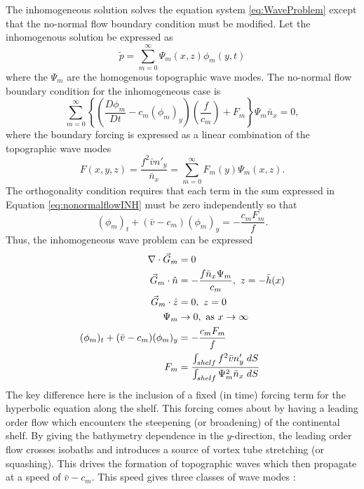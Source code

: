 \documentclass[12pt]{workjournal}
\begin{document}
The inhomogeneous solution solves the equation system \eqref{eq:WaveProblem} except that the no-normal flow boundary condition must be modified. Let the inhomogenous solution be expressed as
\begin{equation}
\tilde{p} = \sum_{m=0}^{\infty} \Psi_m(x,z)\phi_m(y,t)
\end{equation}
where the $\Psi_m$ are the homogenous topographic wave modes.  The no-normal flow boundary condition for the inhomogeneous case is 
\begin{equation}
\sum_{m=0}^{\infty} \left\lbrace \left( \frac{D\phi_m}{Dt} -c_m (\phi_m)_y \right) \left(\frac{ f }{c_m} \right) + F_m \right\rbrace\Psi_m \bar{n}_x = 0, \label{eq:nonormalflowINH}
\end{equation}
where the boundary forcing is expressed as a linear combination of the topographic wave modes
\begin{equation}
F(x,y,z) =  \frac{f^2 \bar{v} n'_y}{\bar{n}_x} = \sum_{m=0}^{\infty}F_m(y) \Psi_m(x,z).
\end{equation}
The orthogonality condition requires that each term in the sum expressed in Equation \eqref{eq:nonormalflowINH} must be zero independently so that
\begin{equation}
(\phi_m)_t + (\bar{v} - c_m) (\phi_m)_y = -\frac{c_m F_m}{f}.
\end{equation}
Thus, the inhomogeneous wave problem can be expressed
\begin{subequations}
\begin{align}
\nabla \cdot \vec{G}_m &= 0 \\
\vec{G}_m \cdot \hat{n} &= -\frac{ f\bar{n}_x \Psi_m }{c_m}, \text{ $z = -\bar{h}(x)$}\\
\vec{G}_m \cdot \hat{z} &= 0, \text{ $z = 0$ } \\
\Psi_m &\rightarrow 0, \text{ as $x\rightarrow \infty$} \\
(\phi_m)_t + (\bar{v} - c_m) (\phi_m)_y &= -\frac{c_m F_m}{f}\\
F_m &= \frac{\int_{shelf} f^2 \bar{v} n'_y\hspace{1mm} dS}{\int_{shelf} \Psi^2_m \bar{n}_x \hspace{1mm} dS}
\end{align}\label{eq:WaveProblemINH}
\end{subequations}
The key difference here is the inclusion of a fixed (in time) forcing term for the hyperbolic equation along the shelf. This forcing comes about by having a leading order flow which encounters the steepening (or broadening) of the continental shelf. By giving the bathymetry dependence in the $y$-direction, the leading order flow crosses isobaths and introduces a source of vortex tube stretching (or squashing). This drives the formation of topographic waves which then propagate at a speed of $\bar{v} - c_m$. This speed gives three classes of wave modes :
\end{document}
